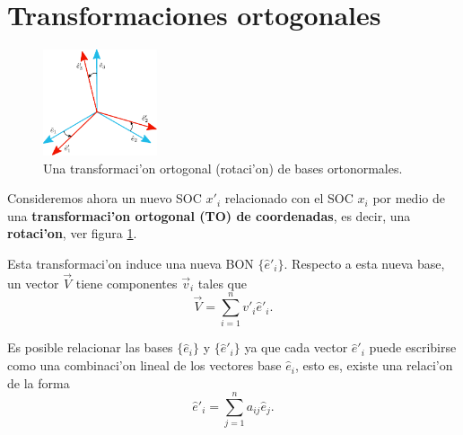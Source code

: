 \section{Transformaciones ortogonales}
\begin{figure}[H]
\centering
\includegraphics[angle=0,width=0.3\textwidth]{figs/fig-rotacion-bases.pdf}
\caption{Una transformaci'on ortogonal (rotaci'on) de bases ortonormales.}
\label{fig-rotacion}
\end{figure}
Consideremos ahora un nuevo SOC $x'_i$ relacionado con el SOC $x_i$ por medio de una \textbf{transformaci'on ortogonal (TO) de coordenadas}, es decir, una \textbf{rotaci'on}, ver figura \ref{fig-rotacion}.


Esta transformaci'on induce una nueva BON $\lbrace\hat{e}'_i\rbrace$. Respecto a esta nueva base, un vector $\vec{V}$ tiene componentes $\vec{v}_i$ tales que
\begin{equation}\label{V2}
\vec{V}=\sum_{i=1}^nv'_i\hat{e}'_i.
\end{equation}

Es posible relacionar las bases $\lbrace\hat{e}_i\rbrace$  y $\lbrace\hat{e}'_i\rbrace$ ya que cada vector $\hat{e}'_i$ puede escribirse como una combinaci'on lineal de los vectores base $\hat{e}_i$, esto es, existe una relaci'on de la forma
\begin{equation}\label{epe0}
\hat{e}'_i=\sum_{j=1}^n a_{ij}\hat{e}_j.
\end{equation}

